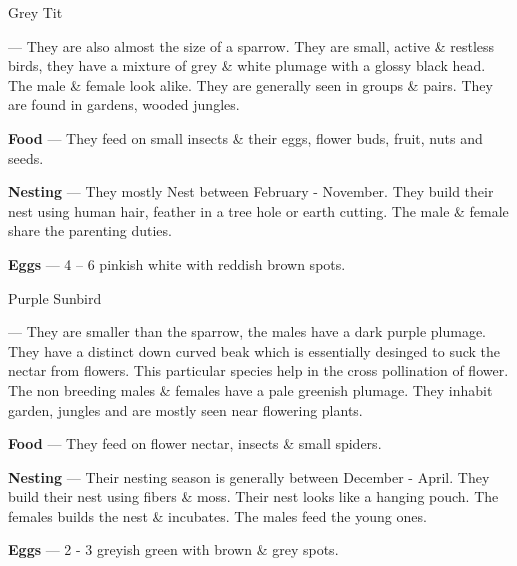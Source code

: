 \begin{bird}{Grey Tit}

 --- They are also almost the size of a sparrow. They are small, active \& restless birds, they have a mixture of grey \& white plumage with a glossy black head. The male \& female look alike. They are generally seen in groups \& pairs. They are found in gardens, wooded jungles. 

{\large\bf Food} --- They feed on small insects \& their eggs, flower buds, fruit, nuts and seeds.

{\large\bf Nesting} --- They mostly Nest between February - November. They build their nest using human hair, feather in a tree hole or earth cutting. The male \& female share the parenting duties.

{\large\bf Eggs} --- 4 -- 6 pinkish white with reddish brown spots.
\end{bird}

\begin{bird}{Purple Sunbird}

 --- They are smaller than the sparrow, the males have a dark purple plumage. They have a distinct down curved beak which is essentially desinged to suck the nectar from flowers. This particular species help in the cross pollination of flower. The non breeding males \& females have a pale greenish plumage. They inhabit garden, jungles and are mostly seen near flowering plants.

{\large\bf Food} --- They feed on flower nectar, insects \& small spiders.

{\large\bf Nesting} --- Their nesting season is generally between December - April. They build their nest using fibers \& moss. Their nest looks like a hanging pouch. The females builds the nest \& incubates. The males feed the young ones.

{\large\bf Eggs} --- 2 - 3 greyish green with brown \& grey spots.
\end{bird}

